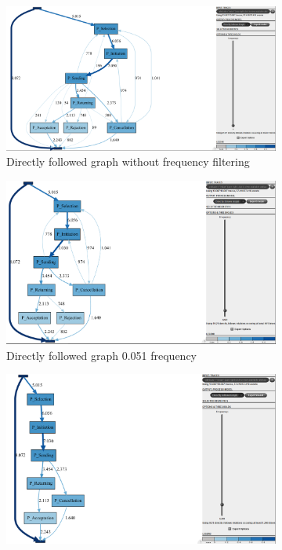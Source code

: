 \begin{figure}[!htbp]
\centering
\begin{subfigure}{.4\textwidth}
  \centering
  \includegraphics[width=\linewidth]{P_DirectlyFollowedFreq0.PNG}
  \caption{Directly followed graph without frequency filtering}
  \label{fig:P_DFG0}
\end{subfigure}%
\begin{subfigure}{.4\textwidth}
  \centering
  \includegraphics[width=\linewidth]{P_DirectlyFollowedFreq0-051.PNG}
  \caption{Directly followed graph 0.051 frequency}
  \label{fig:P_DFG0-051}
\end{subfigure}
\begin{subfigure}{.4\textwidth}
  \centering
  \includegraphics[width=\linewidth]{P_DirectlyFollowedFreq0-1.PNG}

\end{subfigure}
\end{figure}
